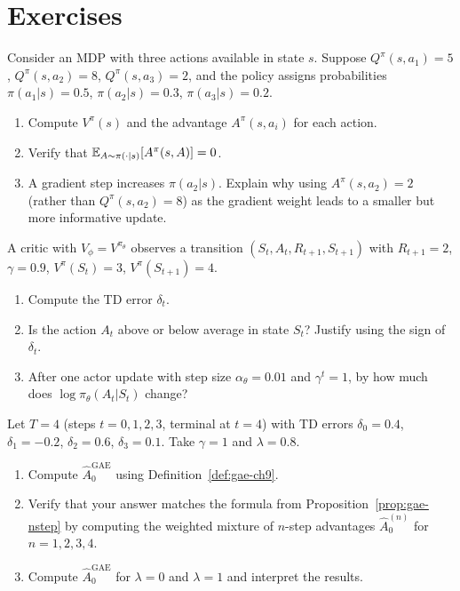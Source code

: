 \section*{Exercises}
\label{sec:ch9-exercises}

\begin{exercise}
\label{ex:advantage-computation}
Consider an MDP with three actions available in state $s$.
Suppose $Q^{\pi}(s, a_1) = 5$, $Q^{\pi}(s, a_2) = 8$, $Q^{\pi}(s, a_3) = 2$,
and the policy assigns probabilities $\pi(a_1|s) = 0.5$, $\pi(a_2|s) = 0.3$,
$\pi(a_3|s) = 0.2$.
\begin{enumerate}[label=(\alph*)]
  \item Compute $V^\pi(s)$ and the advantage $A^\pi(s, a_i)$ for each action.
  \item Verify that $\operatorname{\mathbb{E}}_{A \sim \pi(\cdot|s)}[A^\pi(s,A)] = 0$.
  \item A gradient step increases $\pi(a_2|s)$.  Explain why using
    $A^\pi(s,a_2) = 2$ (rather than $Q^\pi(s,a_2) = 8$) as the gradient
    weight leads to a smaller but more informative update.
\end{enumerate}
\end{exercise}

\begin{exercise}
\label{ex:td-advantage-numeric}
A critic with $V_\phi = V^{\pi_\theta}$ observes a transition
$(S_t, A_t, R_{t+1}, S_{t+1})$ with $R_{t+1} = 2$, $\gamma = 0.9$,
$V^\pi(S_t) = 3$, $V^\pi(S_{t+1}) = 4$.
\begin{enumerate}[label=(\alph*)]
  \item Compute the TD error $\delta_t$.
  \item Is the action $A_t$ above or below average in state $S_t$?
    Justify using the sign of $\delta_t$.
  \item After one actor update with step size $\alpha_\theta = 0.01$
    and $\gamma^t = 1$, by how much does
    $\log \pi_\theta(A_t|S_t)$ change?
\end{enumerate}
\end{exercise}

\begin{exercise}
\label{ex:gae-derivation}
Let $T = 4$ (steps $t = 0,1,2,3$, terminal at $t=4$) with TD errors
$\delta_0 = 0.4$, $\delta_1 = -0.2$, $\delta_2 = 0.6$, $\delta_3 = 0.1$.
Take $\gamma = 1$ and $\lambda = 0.8$.
\begin{enumerate}[label=(\alph*)]
  \item Compute $\hat{A}_0^{\mathrm{GAE}}$ using Definition~\ref{def:gae-ch9}.
  \item Verify that your answer matches the formula from
    Proposition~\ref{prop:gae-nstep} by computing the weighted mixture of
    $n$-step advantages $\hat{A}_0^{(n)}$ for $n = 1, 2, 3, 4$.
  \item Compute $\hat{A}_0^{\mathrm{GAE}}$ for $\lambda = 0$ and
    $\lambda = 1$ and interpret the results.
\end{enumerate}
\end{exercise}

